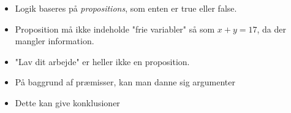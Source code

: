 \documentclass[danish,english,10pt,a4paper]{article}
\begin{document}
\begin{theo}[Proposition] 
\begin{itemize}
\item Logik baseres på \textit{propositions}, som enten er true eller false.
\item Proposition må ikke indeholde "frie variabler" så som $x+y=17$, da der mangler information.
\item "Lav dit arbejde" er heller ikke en proposition.
\end{itemize}
\end{theo}



\begin{theo}[Argument] 
\begin{itemize}
\item På baggrund af præmisser, kan man danne sig argumenter
\item Dette kan give konklusioner
\end{itemize}
\end{theo}
\end{document}
